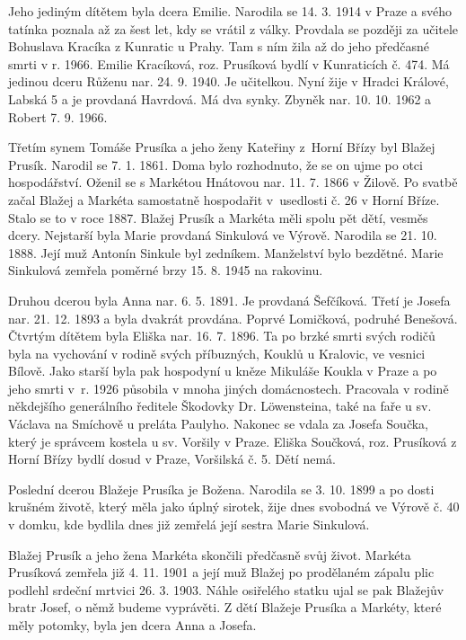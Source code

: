 \documentclass[../dejiny-rodu-prusiku.tex]{subfiles}
\begin{document}
Jeho jediným dítětem byla dcera Emilie. Narodila se 14. 3. 1914 v Praze a svého tatínka poznala až za šest let, kdy se vrátil z války. Provdala se později za učitele Bohusla­va Kracíka z Kunratic u Prahy. Tam s ním žila až do jeho předčasné smrti v r. 1966. Emilie Kracíková, roz. Prusíková bydlí v Kunraticích č. 474. Má jedinou dceru Růženu nar. 24. 9. 1940. Je učitelkou. Nyní žije v Hradci Králové, Labská 5 a je provdaná Havrdová. Má dva synky. Zbyněk nar. 10. 10. 1962 a Robert 7. 9. 1966.

Třetím synem Tomáše Prusíka a jeho ženy Kateřiny z Horní Břízy byl Blažej Prusík. Narodil se 7. 1. 1861. Doma bylo rozhodnuto, že se on ujme po otci hospodářství. Oženil se s Markétou Hnátovou nar. 11. 7. 1866 v Žilově. Po svatbě začal Blažej a Markéta samostatně hospodařit v usedlosti č. 26 v Horní Bříze. Stalo se to v roce 1887. Blažej Prusík a Markéta měli spolu pět dětí, vesměs dcery. Nejstarší byla Marie provdaná Sinkulová ve Výrově. Narodila se
21. 10. 1888. Její muž Antonín Sinkule byl zedníkem. Manželství bylo bezdětné. Marie Sinkulová zemřela poměrné brzy 15. 8. 1945 na rakovinu.

Druhou dcerou byla  Anna nar. 6. 5. 1891. Je provdaná Šefčíková. Třetí je Josefa nar. 21. 12. 1893 a byla dvakrát provdána. Poprvé Lomičková, podruhé Benešová. Čtvrtým dítětem byla Eliška nar. 16. 7. 1896. Ta po brzké smrti svých rodičů byla na vychování v rodině svých příbuzných, Kouklů u Kralovic, ve vesnici Bílově. Jako starší byla pak hospodyní u kněze Mikuláše Koukla v Praze a po jeho smrti v r. 1926 působila v mnoha jiných domácnostech. Pracovala v rodině někdejšího generálního ředitele Ško­dovky Dr. Löwensteina, také na faře u sv. Václava na Smíchově u preláta Paulyho. Nakonec se vdala za Josefa Součka, který je správcem kostela u sv. Voršily v Praze. Eliška Součková, roz. Prusíková z Horní Břízy bydlí dosud v Praze, Voršilská č. 5. Dětí nemá.

Poslední dcerou Blažeje Prusíka je Božena. Narodila se 3. 10. 1899 a po dosti krušném životě, který měla jako úplný sirotek, žije dnes svobodná ve Výrově č. 40 v dom­ku, kde bydlila dnes již zemřelá její sestra Marie Sinkulová.

Blažej Prusík a jeho žena Markéta skončili předčasně svůj život. Markéta Prusíková zemřela již 4. 11. 1901 a její muž Blažej po prodělaném zápalu plic podlehl srdeční mrtvici 26. 3. 1903. Náhle osiřelého statku ujal se pak Blažejův bratr Josef, o němž budeme vyprávěti. Z dětí Blažeje Prusíka a Markéty, které měly potomky, byla jen dcera Anna a Josefa.
\end{document}
